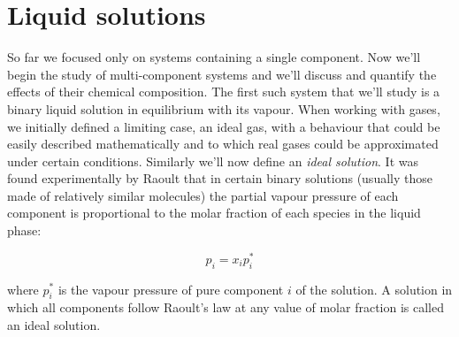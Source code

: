\documentclass[12pt,a4paper]{report}
\newif\ifstudents
\begin{document}
   \pagestyle{headings}
   \thispagestyle{plain}
   \newpage
   \noindent
   \begin{center}
   \end{center}
   \section*{Liquid solutions}
   So far we focused only on systems containing a single component. Now we'll begin the study of multi-component systems and we'll discuss and quantify the effects of their chemical composition. 
   The first such system that we'll study is a binary liquid solution in equilibrium with its vapour.  %
   When working with gases, we initially defined a limiting case, an ideal gas, with a behaviour that could be easily described mathematically and to which real gases could be approximated under certain conditions. Similarly we'll now define an \textit{ideal solution}.
   It was found experimentally by Raoult that in certain binary solutions (usually those made of relatively similar molecules) the partial vapour pressure of each component is proportional to the molar fraction of each species in the liquid phase:
   \ifstudents \hideit[2]{ \fi
   \begin{equation*}
   p_{i}=x_{i}p^{*}_{i}
   \end{equation*}
   \ifstudents } \fi
   where $p^{*}_{i}$ is the vapour pressure of pure component $i$ of the solution. A solution in which all components follow Raoult's law at any value of molar fraction is called an ideal solution.
   \begin{center}
   \end{center}
\end{document}

